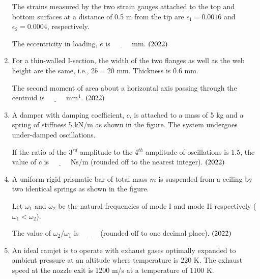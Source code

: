 \documentclass[journal,9pt,onecolumn]{IEEEtran}
\begin{document}
\begin{enumerate}
The strains measured by the two strain gauges attached to the top and bottom surfaces at a distance of 0.5 m from the tip are $\epsilon_1 = 0.0016$ and $\epsilon_2 = 0.0004$, respectively.  

The eccentricity in loading, $e$ is $\underline{\hspace{1cm}}$ mm.   \hfill $\left(2022\right)$
\begin{center}
    
\end{center}
\item For a thin-walled I-section, the width of the two flanges as well as the web height are the same, i.e., $2b = 20$ mm. Thickness is 0.6 mm.

The second moment of area about a horizontal axis passing through the centroid is $\underline{\hspace{1cm}}$ mm$^4$.    \hfill $\left(2022\right)$
\begin{center}
    
\end{center}
\item A damper with damping coefficient, $c$, is attached to a mass of 5 kg and a spring of stiffness 5 kN/m as shown in the figure. The system undergoes under-damped oscillations.

If the ratio of the 3$^{rd}$ amplitude to the 4$^{th}$ amplitude of oscillations is 1.5, the value of $c$ is $\underline{\hspace{1cm}}$ Ns/m (rounded off to the nearest integer).    \hfill $\left(2022\right)$
\begin{center}
    
\end{center}
\item A uniform rigid prismatic bar of total mass $m$ is suspended from a ceiling by two identical springs as shown in the figure.

Let $\omega_1$ and $\omega_2$ be the natural frequencies of mode I and mode II respectively ($\omega_1 < \omega_2$).  

The value of $\omega_2/\omega_1$ is $\underline{\hspace{1cm}}$ (rounded off to one decimal place).  \hfill $\left(2022\right)$
\begin{center}
    
\end{center}
\item An ideal ramjet is to operate with exhaust gases optimally expanded to ambient pressure at an altitude where temperature is 220 K. The exhaust speed at the nozzle exit is 1200 m/s at a temperature of 1100 K.


\end{enumerate}
\end{document}
